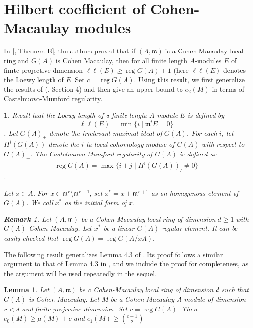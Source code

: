 \documentclass[11pt]{amsart}
\theoremstyle{plain}
\newtheorem{lemma}[theorem]{Lemma}
\newtheorem{remark}[theorem]{Remark}
\newtheorem{point}[theorem]{}
\newcommand{\m}{\mathfrak{m}}
\theoremstyle{plain}
\begin{document}
 

\section{Hilbert coefficient of Cohen-Macaulay modules}
 In [\cite{nawaz}, Theorem B], the authors proved that if $(A,\m)$ is a Cohen-Macaulay local ring and $G(A)$ is Cohen Macaulay,  then for all finite length $A$-modules $E$ of finite projective dimension $\ell\ell(E)\geq \operatorname{reg}G(A)+1$ (here $\ell\ell(E)$ denotes the Loewy length of $E$.  Set $c=\operatorname{reg}G(A)$. Using this result, we first generalize the results of (\cite{Quasipure}, Section 4) and then give an upper bound to $e_2(M)$ in terms of Castelnuovo-Mumford regularity.
\begin{point}
\normalfont
Recall that the \emph{Loewy length} of a finite-length $A$-module $E$ is defined by
$$\ell\ell(E)=\min\{i\mid \mathfrak{m}^iE=0\}$$.
Let $G(A)_+$ denote the irrelevant maximal ideal of $G(A)$. For each $i$, let
$H^i(G(A))$ denote the $i$-th local cohomology module of $G(A)$ with respect to
$G(A)_+$. The \emph{Castelnuovo-Mumford regularity} of $G(A)$ is defined as
$$\operatorname{reg}G(A)=\max\{i+j\mid H^i(G(A))_j\neq 0\}$$.

Let $x\in A$. For $x\in \m^r\setminus \m^{r+1}$, set $x^*=x+\m^{r+1}$ as an homogenous element of $G(A)$. We call $x^*$ as the initial form of $x.$
\begin{remark}\label{regmod}
    Let $(A,\m)$ be a Cohen-Macaulay local ring of dimension $d\geq 1$ with $G(A)$ Cohen-Macaulay. Let $x^*$ be a linear $G(A)$-regular element. It can be easily checked that $\operatorname{reg}G(A)=\operatorname{reg}G(A/xA).$ 
\end{remark}
\end{point}

The following result generalizes Lemma 4.3 of \cite{Quasipure}. Its proof follows a similar argument to that of Lemma 4.3 in \cite{Quasipure}, and we include the proof for completeness, as the argument will be used repeatedly in the sequel.





\begin{lemma}
\label{lowerbound}
Let $(A,\mathfrak{m})$ be a Cohen-Macaulay local ring of dimension $d$ such that $G(A)$ is Cohen-Macaulay. Let $M$ be a Cohen-Macaulay $A$-module of dimension
$r<d$ and finite projective dimension. Set
$c=\operatorname{reg} G(A)$. Then
$e_0(M)\geq\mu(M)+c$ and $e_1(M)\geq\binom{c+1}{2}$.
\end{lemma}
\end{document}
